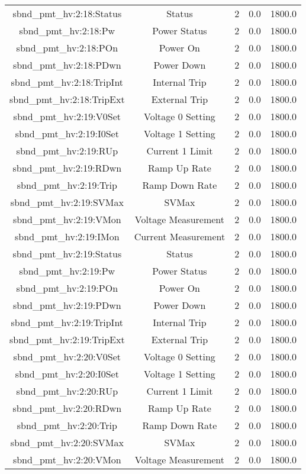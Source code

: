 \begin{table}[ptb]
\begin{tabular}{c | c c c c}
sbnd_pmt_hv:2:18:Status & Status & 2 & 0.0 & 1800.0\\ 
sbnd_pmt_hv:2:18:Pw & Power Status & 2 & 0.0 & 1800.0\\ 
sbnd_pmt_hv:2:18:POn & Power On & 2 & 0.0 & 1800.0\\ 
sbnd_pmt_hv:2:18:PDwn & Power Down & 2 & 0.0 & 1800.0\\ 
sbnd_pmt_hv:2:18:TripInt & Internal Trip & 2 & 0.0 & 1800.0\\ 
sbnd_pmt_hv:2:18:TripExt & External Trip & 2 & 0.0 & 1800.0\\ 
sbnd_pmt_hv:2:19:V0Set & Voltage 0 Setting & 2 & 0.0 & 1800.0\\ 
sbnd_pmt_hv:2:19:I0Set & Voltage 1 Setting & 2 & 0.0 & 1800.0\\ 
sbnd_pmt_hv:2:19:RUp & Current 1 Limit & 2 & 0.0 & 1800.0\\ 
sbnd_pmt_hv:2:19:RDwn & Ramp Up Rate & 2 & 0.0 & 1800.0\\ 
sbnd_pmt_hv:2:19:Trip & Ramp Down Rate & 2 & 0.0 & 1800.0\\ 
sbnd_pmt_hv:2:19:SVMax & SVMax & 2 & 0.0 & 1800.0\\ 
sbnd_pmt_hv:2:19:VMon & Voltage Measurement & 2 & 0.0 & 1800.0\\ 
sbnd_pmt_hv:2:19:IMon & Current Measurement & 2 & 0.0 & 1800.0\\ 
sbnd_pmt_hv:2:19:Status & Status & 2 & 0.0 & 1800.0\\ 
sbnd_pmt_hv:2:19:Pw & Power Status & 2 & 0.0 & 1800.0\\ 
sbnd_pmt_hv:2:19:POn & Power On & 2 & 0.0 & 1800.0\\ 
sbnd_pmt_hv:2:19:PDwn & Power Down & 2 & 0.0 & 1800.0\\ 
sbnd_pmt_hv:2:19:TripInt & Internal Trip & 2 & 0.0 & 1800.0\\ 
sbnd_pmt_hv:2:19:TripExt & External Trip & 2 & 0.0 & 1800.0\\ 
sbnd_pmt_hv:2:20:V0Set & Voltage 0 Setting & 2 & 0.0 & 1800.0\\ 
sbnd_pmt_hv:2:20:I0Set & Voltage 1 Setting & 2 & 0.0 & 1800.0\\ 
sbnd_pmt_hv:2:20:RUp & Current 1 Limit & 2 & 0.0 & 1800.0\\ 
sbnd_pmt_hv:2:20:RDwn & Ramp Up Rate & 2 & 0.0 & 1800.0\\ 
sbnd_pmt_hv:2:20:Trip & Ramp Down Rate & 2 & 0.0 & 1800.0\\ 
sbnd_pmt_hv:2:20:SVMax & SVMax & 2 & 0.0 & 1800.0\\ 
sbnd_pmt_hv:2:20:VMon & Voltage Measurement & 2 & 0.0 & 1800.0\\ 

\end{tabular}
\end{table}
